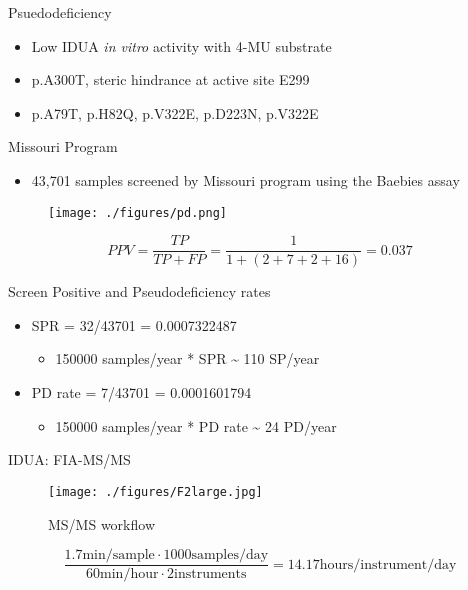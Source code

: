 \documentclass[presentation, smaller]{beamer}
\begin{document}
\begin{frame}[label={sec:orgheadline13}]{Psuedodeficiency}
\begin{itemize}
\item Low IDUA \emph{in vitro} activity with 4-MU substrate
\item p.A300T, steric hindrance at active site E299
\item p.A79T, p.H82Q, p.V322E, p.D223N, p.V322E
\end{itemize}
\end{frame}


\begin{frame}[label={sec:orgheadline14}]{Missouri Program}
\begin{itemize}
\item 43,701 samples screened by Missouri program using the Baebies assay
\end{itemize}

\begin{figure}[htb]
\centering
\texttt{[image: ./figures/pd.png]}
\label{fig:pd}
\end{figure}


\[
 PPV = \frac{TP}{TP + FP}  = \frac{1}{1 + (2 + 7 + 2 + 16)} = 0.037
\]

\begin{block}{Screen Positive and Pseudodeficiency rates}
\begin{itemize}
\item SPR = 32/43701 =  0.0007322487
\begin{itemize}
\item 150000 samples/year * SPR \textasciitilde{}  110 SP/year
\end{itemize}
\item PD rate = 7/43701 = 0.0001601794
\begin{itemize}
\item 150000 samples/year * PD rate \textasciitilde{} 24 PD/year
\end{itemize}
\end{itemize}
\end{block}
\end{frame}

\begin{frame}[label={sec:orgheadline15}]{IDUA: FIA-MS/MS}
\begin{figure}[htb]
\centering
\texttt{[image: ./figures/F2large.jpg]}
\caption{\label{fig:msmswf}
MS/MS workflow}
\end{figure}


\[
\frac{1.7 \text{min/sample} \cdot 1000 \text{samples/day}}{60 \text{min/hour} \cdot 2 \text{instruments}}
= 14.17 \text{hours/instrument/day}
\]
\end{frame}
\end{document}
